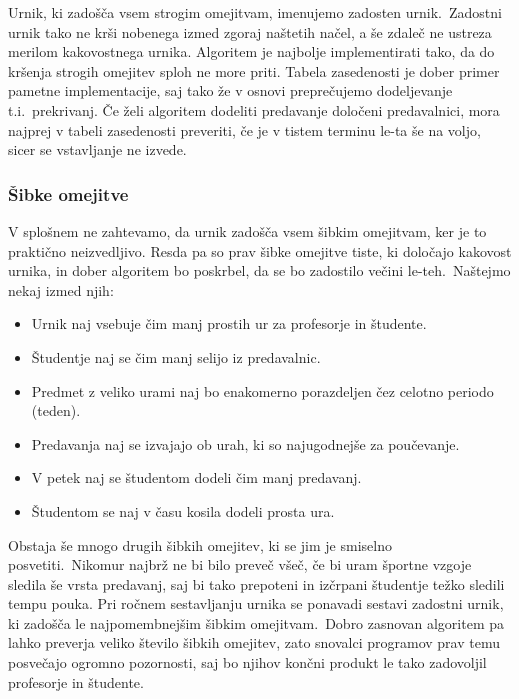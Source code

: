 \documentclass[a4paper,10pt]{article}
\begin{document}
Urnik, ki zadošča vsem strogim omejitvam, imenujemo zadosten urnik.\ Zadostni urnik tako ne
krši nobenega izmed zgoraj naštetih načel, a še zdaleč ne ustreza merilom kakovostnega urnika.
%
Algoritem je najbolje implementirati tako, da do kršenja strogih omejitev sploh ne more priti.
Tabela zasedenosti je dober primer pametne implementacije, saj tako že v osnovi  preprečujemo
dodeljevanje t.i.\ prekrivanj. Če želi algoritem dodeliti predavanje določeni predavalnici,
mora najprej v tabeli zasedenosti preveriti, če je v tistem terminu le-ta še na voljo,
sicer se vstavljanje ne izvede.

\subsubsection{Šibke omejitve}

V splošnem ne zahtevamo, da urnik zadošča vsem šibkim omejitvam, ker je to praktično neizvedljivo.
Resda pa so prav šibke omejitve tiste, ki določajo kakovost urnika, in dober algoritem bo
poskrbel, da se bo zadostilo večini le-teh.\ Naštejmo nekaj izmed njih:

   \begin{itemize}
	\item Urnik naj vsebuje čim manj prostih ur za profesorje in študente.
   \item Študentje naj se čim manj selijo iz predavalnic.
   \item Predmet z veliko urami naj bo enakomerno porazdeljen čez celotno periodo (teden).
   \item Predavanja naj se izvajajo ob urah, ki so najugodnejše za poučevanje.
   \item V petek naj se študentom dodeli čim manj predavanj.
   \item Študentom se naj v času kosila dodeli prosta ura.
\end{itemize}

Obstaja še mnogo drugih šibkih omejitev, ki se jim je smiselno posvetiti.\ Nikomur najbrž ne
bi bilo preveč všeč, če bi uram športne vzgoje sledila še vrsta predavanj, saj bi tako
prepoteni in izčrpani študentje težko sledili tempu pouka.
%
Pri ročnem sestavljanju urnika se ponavadi sestavi zadostni urnik, ki zadošča le
najpomembnejšim šibkim omejitvam.\ Dobro zasnovan algoritem pa lahko preverja veliko
število šibkih omejitev, zato snovalci programov prav temu posvečajo ogromno pozornosti,
saj bo njihov končni produkt le tako zadovoljil profesorje in študente.
\end{document}
